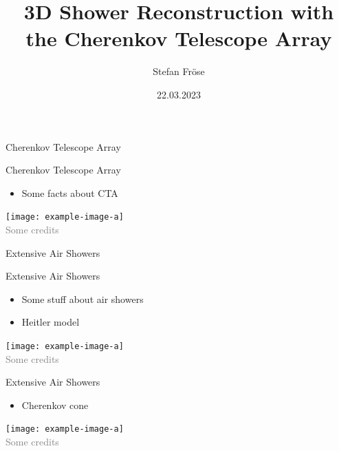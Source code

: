 \documentclass[aspectratio=1610, 9pt]{beamer}
\title{3D Shower Reconstruction with the Cherenkov Telescope Array}
\author[S.~Fröse]{Stefan Fröse}
\institute[WG Elsässer]{WG Elsässer \\  Faculty of Physics}
\date{22.03.2023}
\begin{document}
\maketitle

\begin{frame}
  \begin{center}
    \fontsize{40}{48} \selectfont\textcolor{tugreen}{Cherenkov Telescope Array}
  \end{center}
\end{frame}

\begin{frame}{Cherenkov Telescope Array}
    \begin{minipage}{0.49\textwidth}
        \begin{itemize}
            \item Some facts about CTA
        \end{itemize}
    \end{minipage}
    \hfill
    \begin{minipage}{0.5\textwidth}
        \centering
        \texttt{[image: example-image-a]}\\
        \tiny{{\textcolor{gray}{Some credits}}}
    \end{minipage}
\end{frame}

\begin{frame}
  \begin{center}
    \fontsize{40}{48} \selectfont\textcolor{tugreen}{Extensive Air Showers}
  \end{center}
\end{frame}

\begin{frame}{Extensive Air Showers}
    \begin{minipage}{0.49\textwidth}
        \begin{itemize}
            \item Some stuff about air showers
            \item Heitler model
        \end{itemize}
    \end{minipage}
    \hfill
    \begin{minipage}{0.5\textwidth}
        \centering
        \texttt{[image: example-image-a]}\\
        \tiny{{\textcolor{gray}{Some credits}}}
    \end{minipage}
\end{frame}

\begin{frame}{Extensive Air Showers}
    \begin{minipage}{0.49\textwidth}
        \begin{itemize}
            \item Cherenkov cone
        \end{itemize}
    \end{minipage}
    \hfill
    \begin{minipage}{0.5\textwidth}
        \centering
        \texttt{[image: example-image-a]}\\
        \tiny{{\textcolor{gray}{Some credits}}}
    \end{minipage}
\end{frame}
\end{document}

